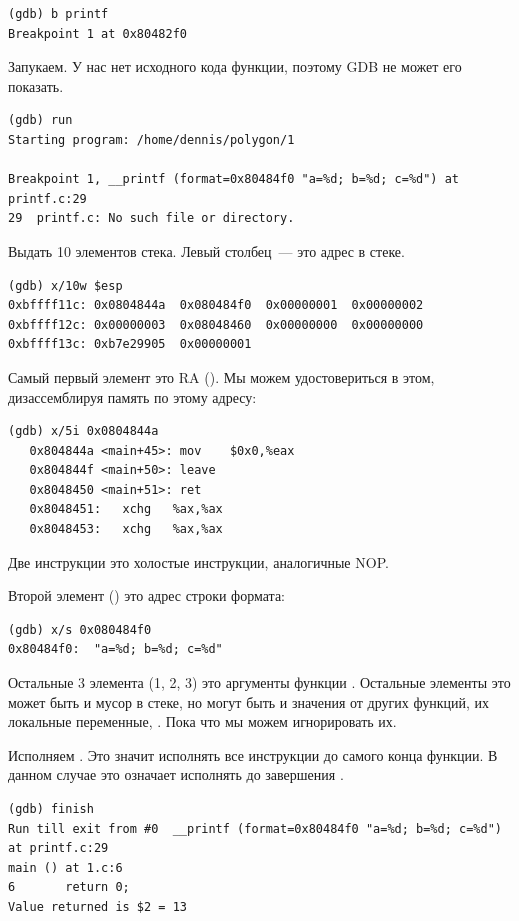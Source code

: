 \begin{lstlisting}[caption=установим точку останова на \printf]
(gdb) b printf
Breakpoint 1 at 0x80482f0
\end{lstlisting}

Запукаем.
У нас нет исходного кода функции, поэтому \ac{GDB} не может его показать.

\begin{lstlisting}
(gdb) run
Starting program: /home/dennis/polygon/1 

Breakpoint 1, __printf (format=0x80484f0 "a=%d; b=%d; c=%d") at printf.c:29
29	printf.c: No such file or directory.
\end{lstlisting}

Выдать 10 элементов стека. Левый столбец~--- это адрес в стеке.

\begin{lstlisting}
(gdb) x/10w $esp
0xbffff11c:	0x0804844a	0x080484f0	0x00000001	0x00000002
0xbffff12c:	0x00000003	0x08048460	0x00000000	0x00000000
0xbffff13c:	0xb7e29905	0x00000001
\end{lstlisting}

Самый первый элемент это \ac{RA} ().
Мы можем удостовериться в этом, дизассемблируя память по этому адресу:

\begin{lstlisting}[label=NOP_as_XCHG_example]
(gdb) x/5i 0x0804844a
   0x804844a <main+45>:	mov    $0x0,%eax
   0x804844f <main+50>:	leave  
   0x8048450 <main+51>:	ret    
   0x8048451:	xchg   %ax,%ax
   0x8048453:	xchg   %ax,%ax
\end{lstlisting}

Две инструкции  это холостые инструкции, аналогичные \ac{NOP}.

Второй элемент () это адрес строки формата:

\begin{lstlisting}
(gdb) x/s 0x080484f0
0x80484f0:	"a=%d; b=%d; c=%d"
\end{lstlisting}

Остальные 3 элемента (1, 2, 3) это аргументы функции \printf.
Остальные элементы это может быть и мусор в стеке, но могут быть и значения
от других функций, их локальные переменные, \etc{}.
Пока что мы можем игнорировать их.

Исполняем . 
Это значит исполнять все инструкции до самого конца функции. 
В данном случае это означает исполнять до завершения \printf.

\begin{lstlisting}
(gdb) finish
Run till exit from #0  __printf (format=0x80484f0 "a=%d; b=%d; c=%d") at printf.c:29
main () at 1.c:6
6		return 0;
Value returned is $2 = 13
\end{lstlisting}

